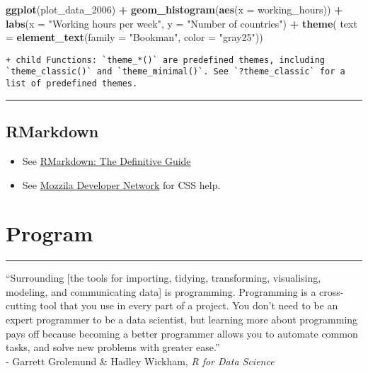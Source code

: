\documentclass[]{book}
\newenvironment{Shaded}{\begin{snugshade}}{\end{snugshade}}
\newcommand{\DataTypeTok}[1]{\textcolor[rgb]{0.13,0.29,0.53}{#1}}
\newcommand{\DecValTok}[1]{\textcolor[rgb]{0.00,0.00,0.81}{#1}}
\newcommand{\KeywordTok}[1]{\textcolor[rgb]{0.13,0.29,0.53}{\textbf{#1}}}
\newcommand{\NormalTok}[1]{#1}
\newcommand{\OperatorTok}[1]{\textcolor[rgb]{0.81,0.36,0.00}{\textbf{#1}}}
\newcommand{\StringTok}[1]{\textcolor[rgb]{0.31,0.60,0.02}{#1}}
\providecommand{\tightlist}{%
  \setlength{\itemsep}{0pt}\setlength{\parskip}{0pt}}
\begin{document}
\begin{Shaded}
\begin{Highlighting}[]
\KeywordTok{ggplot}\NormalTok{(plot_data_}\DecValTok{2006}\NormalTok{) }\OperatorTok{+}
\StringTok{  }\KeywordTok{geom_histogram}\NormalTok{(}\KeywordTok{aes}\NormalTok{(}\DataTypeTok{x =}\NormalTok{ working_hours)) }\OperatorTok{+}
\StringTok{  }\KeywordTok{labs}\NormalTok{(}\DataTypeTok{x =} \StringTok{"Working hours per week"}\NormalTok{,}
       \DataTypeTok{y =} \StringTok{"Number of countries"}\NormalTok{) }\OperatorTok{+}
\StringTok{  }\KeywordTok{theme}\NormalTok{(}
    \DataTypeTok{text =} \KeywordTok{element_text}\NormalTok{(}\DataTypeTok{family =} \StringTok{"Bookman"}\NormalTok{, }\DataTypeTok{color =} \StringTok{"gray25"}\NormalTok{))}
\end{Highlighting}
\end{Shaded}

\begin{verbatim}
+ child Functions: `theme_*()` are predefined themes, including `theme_classic()` and `theme_minimal()`. See `?theme_classic` for a list of predefined themes.
\end{verbatim}

\begin{center}\rule{0.5\linewidth}{\linethickness}\end{center}

\hypertarget{rmarkdown}{%
\section{RMarkdown}\label{rmarkdown}}

\begin{itemize}
\tightlist
\item
  See \href{https://bookdown.org/yihui/rmarkdown/}{RMarkdown: The Definitive Guide}
\item
  See \href{https://developer.mozilla.org/en-US/docs/Web/CSS/CSS_Selectors}{Mozzila Developer Network} for CSS help.
\end{itemize}

\hypertarget{program}{%
\chapter{Program}\label{program}}

\begin{center}\rule{0.5\linewidth}{\linethickness}\end{center}

``Surrounding {[}the tools for importing, tidying, transforming, visualising, modeling, and communicating data{]} is programming. Programming is a cross-cutting tool that you use in every part of a project. You don't need to be an expert programmer to be a data scientist, but learning more about programming pays off because becoming a better programmer allows you to automate common tasks, and solve new problems with greater ease.''\\
- Garrett Grolemund \& Hadley Wickham, \emph{R for Data Science}
\end{document}
